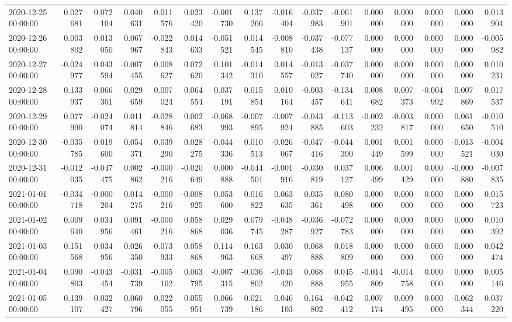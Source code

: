 \begin{tabular}{lrrrrrrrrrrrrrrr}
2020-12-25 00:00:00 & 0.027681 & 0.072104 & 0.040631 & 0.011576 & 0.023420 & -0.001730 & 0.137266 & -0.016404 & -0.037983 & -0.061901 & 0.000000 & 0.000000 & 0.000000 & 0.000000 & 0.013904 \\
2020-12-26 00:00:00 & 0.003802 & 0.013050 & 0.067967 & -0.022843 & 0.014633 & -0.051521 & 0.014545 & -0.008810 & -0.037438 & -0.077137 & 0.000000 & 0.000000 & 0.000000 & 0.000000 & -0.005982 \\
2020-12-27 00:00:00 & -0.024977 & 0.043594 & -0.007455 & 0.008627 & 0.072620 & 0.101342 & -0.014310 & 0.014557 & -0.013027 & -0.037740 & 0.000000 & 0.000000 & 0.000000 & 0.000000 & 0.010231 \\
2020-12-28 00:00:00 & 0.133937 & 0.066301 & 0.029659 & 0.007024 & 0.064554 & 0.037191 & 0.015854 & 0.010164 & -0.003457 & -0.134641 & 0.008682 & 0.007373 & -0.004992 & 0.007869 & 0.017537 \\
2020-12-29 00:00:00 & 0.077990 & -0.024074 & 0.011814 & -0.028846 & 0.002683 & -0.068993 & -0.007895 & -0.007924 & -0.043885 & -0.113603 & -0.002232 & -0.003817 & 0.000000 & 0.061650 & -0.010510 \\
2020-12-30 00:00:00 & -0.035785 & 0.019600 & 0.054371 & 0.039290 & 0.028275 & -0.044336 & 0.010513 & -0.026067 & -0.047416 & -0.044390 & 0.001449 & 0.001599 & 0.000000 & -0.013521 & -0.004030 \\
2020-12-31 00:00:00 & -0.012035 & -0.047475 & 0.002862 & -0.000216 & -0.020649 & 0.000888 & -0.044501 & -0.001916 & -0.030819 & 0.037127 & 0.006499 & 0.001429 & 0.000000 & -0.000880 & -0.007835 \\
2021-01-01 00:00:00 & -0.034718 & -0.000204 & 0.014275 & -0.000216 & -0.008925 & 0.053600 & 0.016822 & 0.063635 & 0.035361 & 0.080498 & 0.000000 & 0.000000 & 0.000000 & 0.000000 & 0.015723 \\
2021-01-02 00:00:00 & 0.009640 & 0.034956 & 0.091461 & -0.000216 & 0.058868 & 0.029036 & 0.079745 & -0.048287 & -0.036927 & -0.072783 & 0.000000 & 0.000000 & 0.000000 & 0.000000 & 0.010392 \\
2021-01-03 00:00:00 & 0.151568 & 0.034956 & 0.026350 & -0.073933 & 0.058868 & 0.114963 & 0.163668 & 0.030497 & 0.068888 & 0.018809 & 0.000000 & 0.000000 & 0.000000 & 0.000000 & 0.042474 \\
2021-01-04 00:00:00 & 0.090803 & -0.043454 & -0.031739 & -0.005102 & 0.063795 & -0.007315 & -0.036802 & -0.043420 & 0.068888 & 0.045955 & -0.014809 & -0.014758 & 0.000000 & 0.000000 & 0.005146 \\
2021-01-05 00:00:00 & 0.139107 & 0.032427 & 0.060796 & 0.022055 & 0.055951 & 0.066739 & 0.021186 & 0.046103 & 0.164802 & -0.042412 & 0.007174 & 0.009495 & 0.000000 & -0.062344 & 0.037220 \\

\end{tabular}
